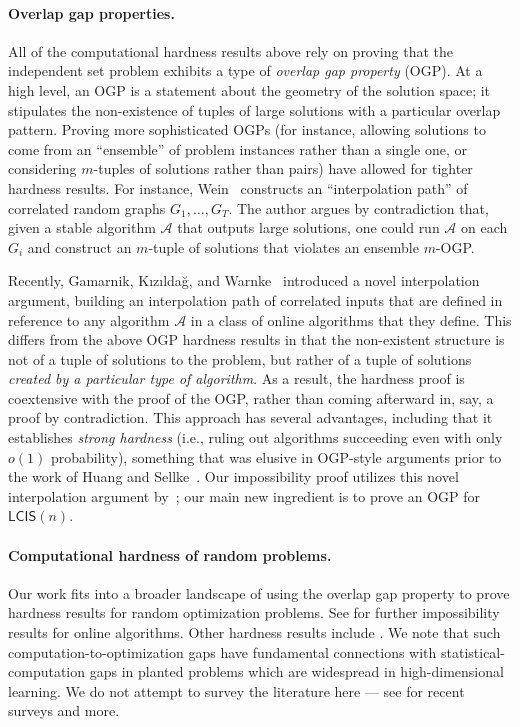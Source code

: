 \documentclass[11pt]{article}
\theoremstyle{plain}
\theoremstyle{definition}
\theoremstyle{remark}
\newcommand{\MCS}{\mathsf{LCIS}}
\newcommand{\Alg}{\mathcal{A}}
\begin{document}
\paragraph{Overlap gap properties.}
All of the computational hardness results above rely on proving that the independent set problem exhibits a type of \emph{overlap gap property} (OGP). At a high level, an OGP is a statement about the geometry of the solution space; it stipulates the non-existence of tuples of large solutions with a particular overlap pattern. Proving more sophisticated OGPs (for instance, allowing solutions to come from an ``ensemble'' of problem instances rather than a single one, or considering $m$-tuples of solutions rather than pairs) have allowed for tighter hardness results. For instance, Wein~\cite{Wei21} constructs an ``interpolation path'' of correlated random graphs $G_1, \dots, G_T$. The author argues by contradiction that, given a stable algorithm $\Alg$ that outputs large solutions, one could run $\Alg$ on each $G_i$ and construct an $m$-tuple of solutions that violates an ensemble $m$-OGP. 


Recently, Gamarnik, K{\i}z{\i}lda\u{g}, and Warnke~\cite{GKW25} introduced a novel interpolation argument, building an interpolation path of correlated inputs that are defined in reference to any algorithm $\Alg$ in a class of online algorithms that they define. This differs from the above OGP hardness results in that the non-existent structure is not of a tuple of solutions to the problem, but rather of a tuple of solutions \emph{created by a particular type of algorithm}. As a result, the hardness proof is coextensive with the proof of the OGP, rather than coming afterward in, say, a proof by contradiction. 
This approach has several advantages, including that it establishes \emph{strong hardness} (i.e., ruling out algorithms succeeding even with only $o(1)$ probability), something that was elusive in OGP-style arguments prior to the work of Huang and Sellke~\cite{HS25}. 
Our impossibility proof utilizes this novel interpolation argument by~\cite{GKW25}; our main new ingredient is to prove an OGP for $\MCS(n)$. 



\paragraph{Computational hardness of random problems.}
Our work fits into a broader landscape of using the overlap gap property to prove hardness results for random optimization problems. See \cite{DGH25, GKPX23, BGG26} for further impossibility results for online algorithms. Other hardness results include \cite{GKPX22, huang2025tight, HS25}. 
We note that such computation-to-optimization gaps have fundamental connections with statistical-computation gaps in planted problems which are widespread in high-dimensional learning. 
We do not attempt to survey the literature here --- see \cite{Gam21, Gam25} for recent surveys and more.
\end{document}
